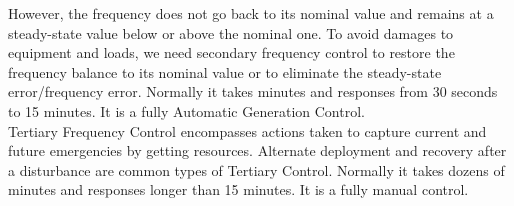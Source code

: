 However, the frequency does not go back to its nominal value and remains at a steady-state value below or above the nominal one. To avoid damages to equipment and loads, we need secondary frequency control to \cite{machowski2011power} restore the frequency balance to its nominal value or to eliminate the steady-state error/frequency error. Normally it takes minutes and responses from 30 seconds to 15 minutes. It is a fully Automatic Generation Control.\\


Tertiary Frequency Control encompasses actions taken to capture current and future emergencies by getting resources. Alternate deployment and recovery after a disturbance are common types of Tertiary Control. Normally it takes dozens of minutes and responses longer than 15 minutes. It is a fully manual control.